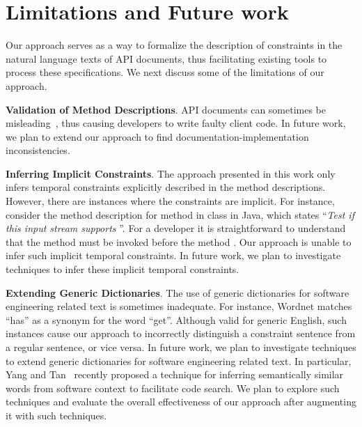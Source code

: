 \section{Limitations and Future work}
\label{sec:discussion}

Our approach serves as a way to formalize the description of constraints in the natural language texts of API documents, thus facilitating existing tools to process these specifications. We next discuss some of the limitations of our approach.

\textbf{Validation of Method Descriptions}. API documents can sometimes be misleading~\cite{tcomment,Cindy10:PASTE}, thus causing developers to write faulty client code. In future work, we plan to extend our approach to find documentation-implementation inconsistencies.

\textbf{Inferring Implicit Constraints}. The approach presented in this work only infers temporal constraints explicitly described in the method descriptions.
However, there are instances where the constraints are implicit. For instance, consider the method description for  method in  class in Java, which states ``\textit{Test if this input stream supports }''. For a developer it is straightforward to understand that the method  must be invoked before the method . Our approach is unable to infer such implicit temporal constraints. In future work, we plan to investigate techniques to infer these implicit temporal constraints.

\textbf{Extending Generic Dictionaries}. The use of generic dictionaries for software engineering related text is sometimes inadequate. For instance, Wordnet matches ``has'' as a synonym for the word ``get''. Although valid for generic English, such instances cause our approach to incorrectly distinguish a constraint sentence from a regular sentence, or vice versa. In future work, we plan to investigate techniques to extend generic dictionaries for software engineering related text. In particular, Yang and Tan~\cite{swordnet} recently proposed a technique for inferring semantically similar words from software context to facilitate code search. We plan to explore such techniques and evaluate the overall effectiveness of our approach after augmenting it with such techniques.  

